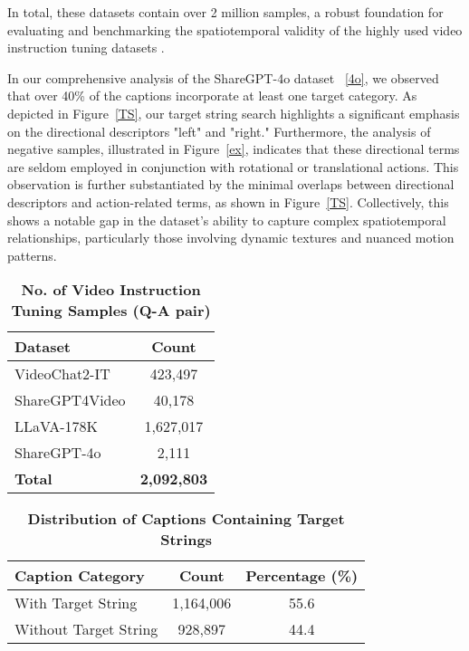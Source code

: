 In total, these datasets contain over 2 million samples, a robust foundation for evaluating and benchmarking the spatiotemporal validity of the highly used video instruction tuning datasets . 

In our comprehensive analysis of the ShareGPT-4o dataset ~\ref{4o}, we observed that over 40\% of the captions incorporate at least one target category. As depicted in Figure~\ref{TS}, our target string search highlights a significant emphasis on the directional descriptors "left" and "right." Furthermore, the analysis of negative samples, illustrated in Figure~\ref{ex}, indicates that these directional terms are seldom employed in conjunction with rotational or translational actions. This observation is further substantiated by the minimal overlaps between directional descriptors and action-related terms, as shown in Figure~\ref{TS}. Collectively, this shows a notable gap in the dataset's ability to capture complex spatiotemporal relationships, particularly those involving dynamic textures and nuanced motion patterns.


\begin{table}[h]
    \centering
    \renewcommand{\arraystretch}{1.2}
    \label{tab:dataset_distribution}
    \begin{tabular}{l c}
        \toprule
        \textbf{Dataset} & \textbf{Count} \\
        \midrule
        VideoChat2-IT & 423,497 \\
        ShareGPT4Video & 40,178 \\
        LLaVA-178K & 1,627,017 \\
        ShareGPT-4o & 2,111 \\
        \midrule
        \textbf{Total} & \textbf{2,092,803} \\
    \end{tabular}
     \caption{\textbf{No. of Video Instruction Tuning Samples (Q-A pair)}}
    \label{tab:dataset_sizes}
\end{table}



\begin{table}[h]
    \centering
    \begin{tabular}{|l|c|c|}
        \hline
        \textbf{Caption Category} & \textbf{Count} & \textbf{Percentage (\%)} \\
        \hline
        With Target String & 1,164,006 & 55.6 \\
        Without Target String & 928,897 & 44.4 \\
        \hline
    \end{tabular}
    \caption{\textbf{Distribution of Captions Containing Target Strings}}
    \label{tab:caption_distribution}
\end{table}




